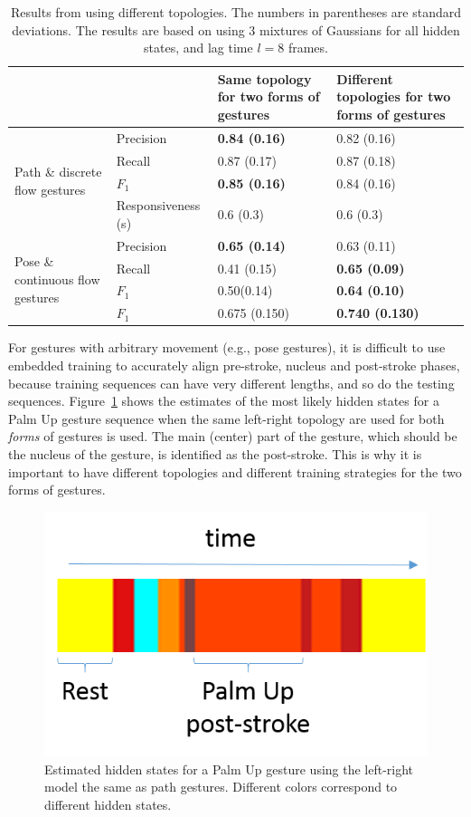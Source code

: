 \begin{table}[tbh]
\centering
\begin{tabular}{|l|l|p{3cm}|p{3cm}|}
\hline
& & \textbf{Same topology for two forms of gestures} & \textbf{Different
topologies for two forms of gestures} \\
\hline
\multirow{4}{4cm}{Path \& discrete flow gestures} 
& Precision & \textbf{0.84 (0.16)} & 0.82 (0.16) \\
\cline{2-4}
& Recall & 0.87 (0.17) & 0.87 (0.18)\\
\cline{2-4}
& $F_1$ & \textbf{0.85 (0.16)} &  0.84 (0.16)\\
\cline{2-4}
& Responsiveness (s) & 0.6 (0.3) & 0.6 (0.3) \\
\hline
\multirow{4}{4.5cm}{Pose \& continuous flow gestures}
& Precision & \textbf{0.65 (0.14)} & 0.63 (0.11) \\
\cline{2-4}
& Recall & 0.41 (0.15) & \textbf{0.65 (0.09)} \\
\cline{2-4}
& $F_1$ & 0.50(0.14) & \textbf{0.64 (0.10)} \\
\hline
\textbf{Average} & $F_1$ & 0.675 (0.150) & \textbf{0.740 (0.130)} \\
\hline
\end{tabular}
\caption{Results from using different topologies. The numbers in parentheses are
standard deviations. The results are based on using 3 mixtures of Gaussians
for all hidden states, and lag time
$l = 8$ frames.}
\label{tab:result}
\end{table}

For gestures with arbitrary movement (e.g., pose gestures), it is difficult to
use embedded training to accurately align pre-stroke, nucleus and post-stroke
phases, because training sequences can have very different lengths, and so do
the testing sequences.
Figure~\ref{fig:palm-hidden} shows the estimates of
the most likely hidden states for a Palm Up gesture sequence when the same
left-right topology are used for both \textit{forms} of gestures is used.
The main (center) part of the gesture, which should be the nucleus of the gesture, is identified
as the post-stroke. This is why it is important to have different topologies and
different training strategies for the two forms of gestures.

\begin{figure}[tbh]
\centering
\includegraphics[width=0.3\linewidth]{figures/palm_hidden_label.png}
\caption{Estimated hidden states for a Palm Up gesture using the
left-right model the same as path gestures. Different colors correspond to
different hidden states.}
\label{fig:palm-hidden}
\end{figure}

